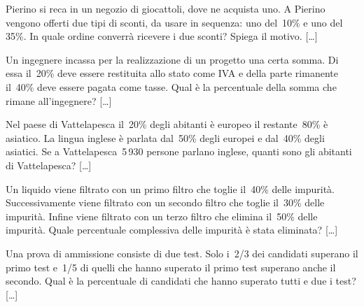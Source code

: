 \begin{htmulticols}{2}
\begin{esercizio}
\label{ese:3.206}
Pierino si reca in un negozio di giocattoli, dove ne acquista uno. A
Pierino vengono offerti due tipi di sconti, da usare in sequenza: uno 
del~10\% e uno del
35\%. In quale ordine converrà ricevere i due sconti? Spiega il
motivo. \hfill [\dots]
\end{esercizio}


\begin{esercizio}
\label{ese:3.208}
Un ingegnere incassa per la realizzazione di un progetto una
certa somma. Di essa il~20\% deve essere restituita allo stato come IVA
e della parte rimanente il~40\% deve essere pagata come tasse. Qual è
la percentuale della somma che rimane all'ingegnere? \hfill [\dots]
\end{esercizio}

\begin{esercizio}
\label{ese:3.209}
Nel paese di Vattelapesca il~20\% degli abitanti è europeo il
restante~80\% è asiatico. La lingua inglese è parlata dal~50\% degli
europei e dal~40\% degli asiatici. Se a Vattelapesca~5\,930 persone
parlano inglese, quanti sono gli abitanti di Vattelapesca? \hfill [\dots]
\end{esercizio}

\begin{esercizio}
\label{ese:3.210}
Un liquido viene filtrato con un primo filtro che toglie il~40\%
delle impurità. Successivamente viene filtrato con un secondo filtro
che toglie il~30\% delle impurità. Infine viene filtrato con un terzo
filtro che elimina il~50\% delle impurità. Quale percentuale
complessiva delle impurità è stata eliminata? \hfill [\dots]
\end{esercizio}

\begin{esercizio}
\label{ese:3.211}
Una prova di ammissione consiste di due test. Solo i~2/3 dei
candidati superano il primo test e~1/5 di quelli che hanno superato il
primo test superano anche il secondo. Qual è la percentuale di
candidati che hanno superato tutti e due i test? \hfill [\dots]
\end{esercizio}


\end{htmulticols}
